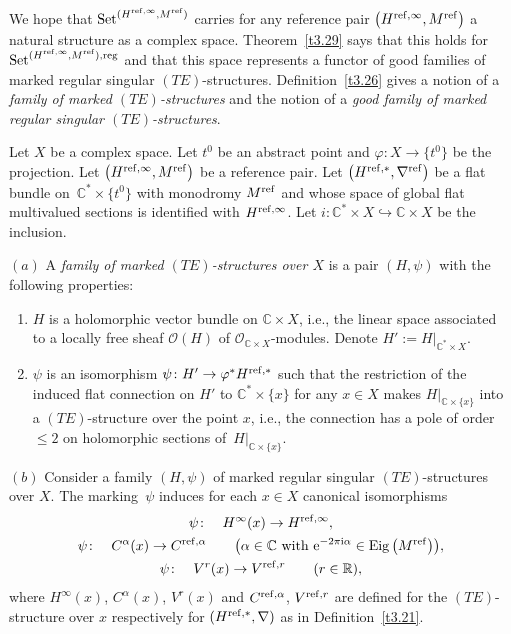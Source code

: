 \documentclass[10pt,a4paper]{amsart}
\numberwithin{equation}{section}
\numberwithin{figure}{section}
\newcommand{\C}{{\mathbb C}}
\newcommand{\R}{{\mathbb R}}
\newcommand{\OO}{{\mathcal O}}
\newcommand{\nnn}{\nabla}
\DeclareMathOperator{\Eig}{Eig}
\begin{document}
We hope that ${\rm Set}^{(H^{{\rm ref},\infty},M^{\rm ref})}$ carries for
any reference pair $\big(H^{{\rm ref},\infty},M^{\rm ref}\big)$ a natural
structure as a complex space.
Theorem~\ref{t3.29} says that this holds for
${\rm Set}^{(H^{{\rm ref},\infty},M^{\rm ref}),{\rm reg}}$
and that this space represents a functor of good families
of marked regular singular $(TE)$-structures.
Definition~\ref{t3.26} gives a notion of a
{\it family of marked $(TE)$-structures}
and the notion of a {\it good family of marked regular
singular $(TE)$-structures}.

\begin{Definition}\label{t3.26}
Let $X$ be a complex space.
Let $t^0$ be an abstract point and
$\varphi\colon X\to\big\{t^0\big\}$ be the projection.
Let $\big(H^{{\rm ref},\infty},M^{\rm ref}\big)$ be a reference pair.
Let $\big(H^{{\rm ref},*},\nnn^{\rm ref}\big)$ be a flat bundle
on~$\C^*\times\big\{t^0\big\}$ with monodromy $M^{\rm ref}$
and whose space of global flat multivalued sections
is identified with $H^{{\rm ref},\infty}$.
Let $i\colon \C^*\times X\hookrightarrow \C\times X$
be the inclusion.

$(a)$ A {\it family of marked $(TE)$-structures over $X$}
is a pair $(H,\psi)$ with the following properties:
\begin{enumerate}\itemsep=0pt\setlength{\leftskip}{0.65cm}
\item[$(i)$]
$H$ is a holomorphic vector bundle on $\C\times X$,
i.e., the linear space associated to a locally free sheaf
$\OO(H)$ of $\OO_{\C\times X}$-modules.
Denote $H':=H|_{\C^*\times X}$.
\item[$(ii)$]
$\psi$ is an isomorphism $\psi\colon H'\to \varphi^* H^{{\rm ref},*}$
such that the restriction of the induced flat connection on $H'$
to $\C^*\times\{x\}$ for any $x\in X$ makes $H|_{\C\times\{x\}}$
into a $(TE)$-structure over the point $x$, i.e.,
the connection has a pole of order $\leq 2$ on holomorphic
sections of~$H|_{\C\times\{x\}}$.
\end{enumerate}

$(b)$ Consider a family $(H,\psi)$ of marked
regular singular $(TE)$-structures over $X$.
The marking~$\psi$ induces for each $x\in X$
canonical isomorphisms
\begin{gather*}
\psi\colon\quad H^\infty(x)\to H^{{\rm ref},\infty},%
\\
\psi\colon\quad C^{\alpha}(x)\to C^{{\rm ref},\alpha}\qquad
\big(\alpha\in\C\text{ with }{\rm e}^{-2\pi {\rm i}\alpha}\in\Eig\big(M^{\rm ref}\big)\big),
\nonumber
\\
\psi\colon\quad V^r(x)\to V^{{\rm ref},r} \qquad (r\in\R), \nonumber
\end{gather*}
where $H^{\infty}(x)$, $C^{\alpha}(x)$, $V^r(x)$ and
$C^{{\rm ref},\alpha}$, $V^{{\rm ref},r}$ are defined for the
$(TE)$-structure over $x$ respectively for $(H^{{\rm ref},*},\nnn)$
as in Definition~\ref{t3.21}.


\end{Definition}
\end{document}
